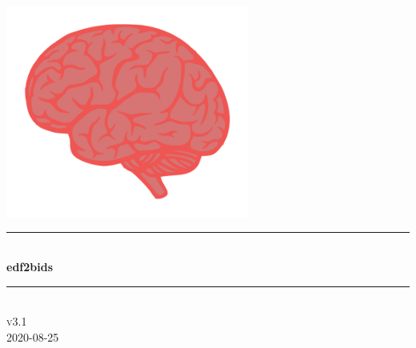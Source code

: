 \begin{titlepage}

\newcommand{\HRule}{\rule{\linewidth}{0.5mm}} %

\center %




\includegraphics[width=0.6\textwidth]{img/edf2bids_icon.png}\\[1cm] 


\HRule \\[0.4cm]
{ \huge \bfseries edf2bids}\\[0.4cm] %
\HRule \\[1.5cm]


\textsc{\large v3.1}\\[0.5cm]{\large 2020-08-25}\\[2cm]\vfill\end{titlepage}